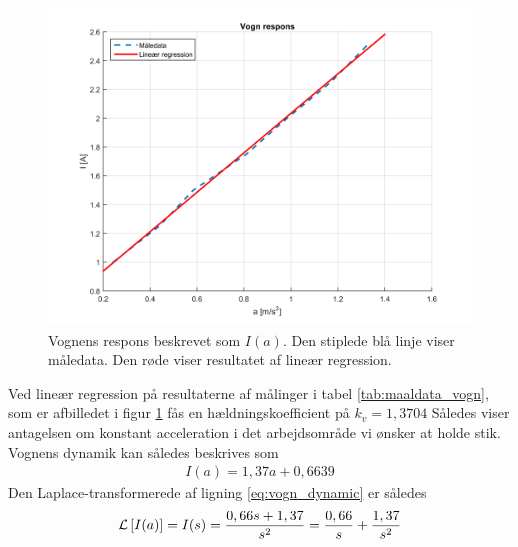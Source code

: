 \begin{figure}[h!]
	\centering
	\includegraphics[width=.8\textwidth]{billeder/vogn_response.png}
	\caption[Vognens respons $I(a)$]{Vognens respons beskrevet som $I(a)$. Den stiplede blå linje viser måledata. Den røde viser resultatet af lineær regression.}
	\label{fig:vogn_response}
\end{figure}

Ved lineær regression på resultaterne af målinger i tabel \ref{tab:maaldata_vogn}, som er afbilledet i figur \ref{fig:vogn_response} fås en hældningskoefficient på $k_v = 1,3704$ 
Således viser antagelsen om konstant acceleration i det arbejdsområde vi ønsker at holde stik.
Vognens dynamik kan således beskrives som
\begin{align}
I(a) = 1,37a + 0,6639  \label{eq:vogn_dynamic}
\end{align} 
Den Laplace-transformerede af ligning \ref{eq:vogn_dynamic} er således
\begin{align}
\operatorname{\mathcal{L}}{ \left[ I(a) \right]} = I(s) = \frac{0,66s + 1,37}{s^2} = \frac{0,66}{s} + \frac{1,37}{s^2} \label{eq:vogn_dynamic_trans}
\end{align}

